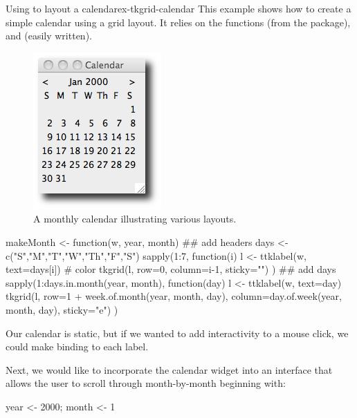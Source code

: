\begin{example}{Using  to layout a calendar}{ex-tkgrid-calendar}
This example shows how to create a simple calendar using a grid
layout. It relies on the functions  (from the
 package),  and
 (easily written).




\begin{figure}
  \centering
  \includegraphics[width=.6\textwidth]{fig-tcltk-grid-calendar}
  \caption{A monthly calendar illustrating various layouts.}
  \label{fig:qt-gridlayout-calendar}
\end{figure}


\begin{Schunk}
\begin{Sinput}
 makeMonth <- function(w, year, month) {
   ## add headers
   days <- c("S","M","T","W","Th","F","S")
   sapply(1:7, function(i) {
     l <- ttklabel(w, text=days[i])           # color
     tkgrid(l, row=0, column=i-1, sticky="")
   })
   ## add days
   sapply(1:days.in.month(year, month),  function(day) {
     l <- ttklabel(w, text=day)
     tkgrid(l, row=1 + week.of.month(year, month, day),
            column=day.of.week(year, month, day),
            sticky="e")
   })
 }
\end{Sinput}
\end{Schunk}

Our calendar is static, but if we wanted to add interactivity to a
mouse click, we could make binding to each label.


Next, we would like to incorporate the calendar widget into an interface
that allows the user to scroll through month-by-month beginning with:
\begin{Schunk}
\begin{Sinput}
 year <- 2000; month <- 1
\end{Sinput}
\end{Schunk}


\end{example}
